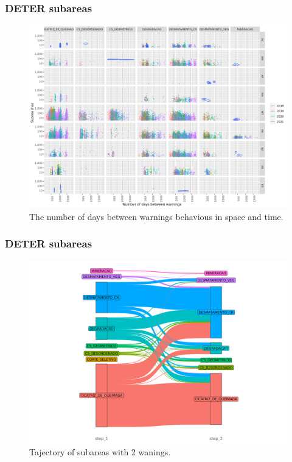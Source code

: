 \documentclass[aspectratio=169]{beamer}
\begin{document}
\begin{frame}
    \frametitle{DETER subareas}
    \begin{figure}[h] 
        \includegraphics[width=0.65\linewidth]
        {./figures/plot_deter_subarea_density_by_state_first-type_nwarnings.png}
        \caption{The number of days between warnings behavious in space and 
        time.}
        \label{fig:deter_subarea_density_state_first_type_nwarnings}
    \end{figure}
\end{frame}

\begin{frame}
    \frametitle{DETER subareas}
    \begin{figure}[h] 
        \includegraphics[width=0.65\linewidth]
        {./figures/plot_deter_subarea_trajectory_2.png}
        \caption{Tajectory of subareas with 2 wanings.}
        \label{fig:deter_subarea_trajectory_2}
    \end{figure}
\end{frame}
\end{document}
